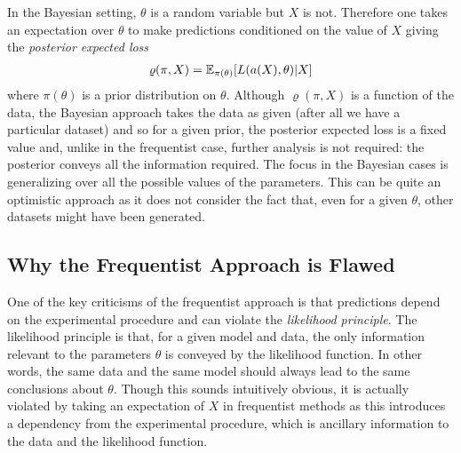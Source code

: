 In the Bayesian setting, $\theta$ is a random variable but $X$ is not.  Therefore one takes an expectation over $\theta$
to make predictions conditioned on the value of $X$ giving the \emph{posterior expected loss}~\cite{robert2007bayesian}
\begin{align}
\label{eq:bayes:bayes-est}
\varrho(\pi,X) = \mathbb{E}_{\pi(\theta)} [L(a(X),\theta) | X]
\end{align}
where $\pi(\theta)$ is a prior distribution on $\theta$.  Although $\varrho(\pi,X)$ is a function of the data, the Bayesian
approach takes the data as given (after all we have a particular dataset) and so for a given prior, the posterior
expected loss is a fixed value and, unlike in the frequentist case, further analysis is not required: the posterior
conveys all the information required.  The focus in the Bayesian cases is generalizing over all the possible values of
the parameters.  This can be quite an optimistic approach as it does not consider the fact that, even for a given $\theta$,
other datasets might have been generated.  

\subsection{Why the Frequentist Approach is Flawed}
\label{sec:bayes:religion:freq}

One of the key criticisms of the frequentist approach is that predictions depend on the experimental procedure and
can violate the \emph{likelihood principle}.  The likelihood principle is that, for a given model and data, the only information relevant
to the parameters $\theta$ is conveyed by the likelihood function.  In other words, the same data and the same model should
always lead to the same conclusions about $\theta$.  Though this sounds intuitively obvious, it is actually violated by
taking an expectation of $X$ in frequentist methods as this introduces a dependency from the experimental procedure, which
is ancillary information to the data and the likelihood function.  

